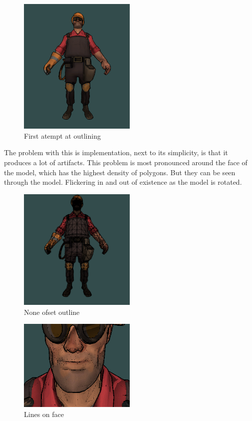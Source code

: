 \begin{figure}[h]
    \centering
    \includegraphics[width=0.5\textwidth]{img/ModelB.png}
    \caption{First atempt at outlining}
    \label{fig-render-overview}
\end{figure}

The problem with this is implementation, next to its simplicity, is that it produces a lot of artifacts. This problem is most pronounced around the face of the model, which has the highest density of polygons. But they can be seen through the model. Flickering in and out of existence as the model is rotated.

\begin{figure}[h]
    \centering
    \includegraphics[width=0.5\textwidth]{img/ModelA.png}
    \caption{None ofset outline}
    \label{fig-render-overview}
\end{figure}

\begin{figure}[h]
    \centering
    \includegraphics[width=0.5\textwidth]{img/ModelC.png}
    \caption{Lines on face}
    \label{fig-render-overview}
\end{figure}

